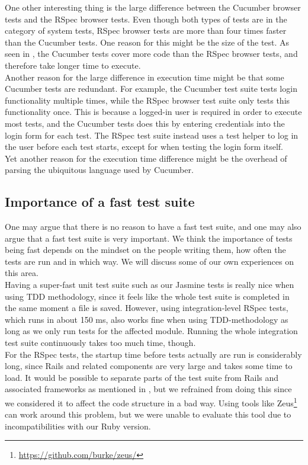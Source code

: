 One other interesting thing is the large difference between the Cucumber
browser tests and the RSpec browser tests. Even though both types of
tests are in the category of system tests, RSpec browser tests are more
than four times faster than the Cucumber tests. One reason for this
might be the size of the test. As seen in ,
the Cucumber tests cover more code than the RSpec browser tests, and
therefore take longer time to execute.\\

Another reason for the large difference in execution time might be that
some Cucumber tests are redundant. For example, the Cucumber test suite
tests login functionality multiple times, while the RSpec browser test
suite only tests this functionality once. This is because a logged-in
user is required in order to execute most tests, and the Cucumber tests
does this by entering credentials into the login form for each test. The
RSpec test suite instead uses a test helper to log in the user before
each test starts, except for when testing the login form itself.\\

Yet another reason for the execution time difference might be the
overhead of parsing the ubiquitous language used by Cucumber.\\


\subsection{Importance of a fast test suite}

One may argue that there is no reason to have a fast test suite, and one
may also argue that a fast test suite is very important. We think the
importance of tests being fast depends on the mindset on the people
writing them, how often the tests are run and in which way. We will
discuss some of our own experiences on this area.\\

Having a super-fast unit test suite such as our Jasmine tests is really
nice when using TDD methodology, since it feels like the whole test
suite is completed in the same moment a file is saved. However, using
integration-level RSpec tests, which runs in about 150 ms, also works
fine when using TDD-methodology as long as we only run tests for the
affected module. Running the whole integration test suite continuously
takes too much time, though.\\

For the RSpec tests, the startup time before tests actually are run is
considerably long, since Rails and related components are very large and
takes some time to load. It would be possible to separate parts of the
test suite from Rails and associated frameworks as mentioned in
, but we refrained from doing this since we
considered it to affect the code structure in a bad way. Using tools
like Zeus\footnote{\url{https://github.com/burke/zeus/}} can work around
this problem, but we were unable to evaluate this tool due to
incompatibilities with our Ruby version.\\

